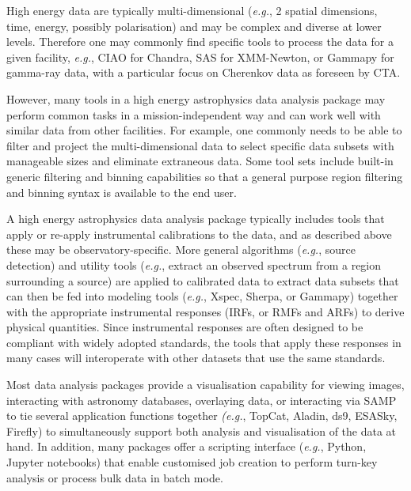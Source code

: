 \documentclass[11pt,a4paper]{ivoa}
\begin{document}
{%

High energy data are typically multi-dimensional ({\em e.g.\/}, 2 spatial dimensions, time, energy, possibly polarisation) and may be complex and diverse at lower levels.  Therefore one may commonly find specific tools to process the data for a given facility, {\em e.g.\/}, CIAO for Chandra, SAS for XMM-Newton, or Gammapy for gamma-ray data, with a particular focus on Cherenkov data as foreseen by CTA.

However, many tools in a high energy astrophysics data analysis package may perform common tasks in a mission-independent way and can work well with similar data from other facilities.  For example, one commonly needs to be able to filter and project the multi-dimensional data to select specific data subsets with manageable sizes and eliminate extraneous data.  Some tool sets include built-in generic filtering and binning capabilities so that a general purpose region filtering and binning syntax is available to the end user.

A high energy astrophysics data analysis package typically includes tools that apply or re-apply instrumental calibrations to the data, and as described above these may be observatory-specific.  More general algorithms ({\em e.g.\/}, source detection) and utility tools ({\em e.g.\/}, extract an observed spectrum from a region surrounding a source) are applied to calibrated data to extract data subsets that can then be fed into modeling tools ({\em e.g.\/}, Xspec, Sherpa, or Gammapy) together with the appropriate instrumental responses (IRFs, or RMFs and ARFs) to derive physical quantities.  Since instrumental responses are often designed to be compliant with widely adopted standards, the tools that apply these responses in many cases will interoperate with other datasets that use the same standards.

Most data analysis packages provide a visualisation capability for viewing images, interacting with astronomy databases, overlaying data, or interacting via SAMP to tie several application functions together {\em (e.g.\/}, TopCat, Aladin, ds9, ESASky, Firefly) to simultaneously support both analysis and visualisation of the data at hand.  In addition, many packages offer a scripting interface ({\em e.g.\/}, Python, Jupyter notebooks) that enable customised job creation to perform turn-key analysis or process bulk data in batch mode.

}
\end{document}
